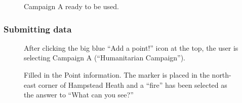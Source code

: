 \documentclass{article}
\begin{document}
		\begin{figure}[H]
			\centering
			\caption{Campaign A ready to be used.}
			\label{fig:eval-ca-4}
		\end{figure}

		\FloatBarrier

		\subsubsection{Submitting data}

		\begin{figure}[H]
			\centering
			\caption{After clicking the big blue ``Add a point!'' icon at the top, the user is selecting Campaign A (``Humanitarian Campaign'').}
			\label{fig:eval-submita-1}
		\end{figure}

		\begin{figure}[H]
			\centering
			\caption{Filled in the Point information. The marker is placed in the north-east corner of Hampstead Heath and a ``fire'' has been selected as the answer to ``What can you see?''}
			\label{fig:eval-submita-2}
		\end{figure}
\end{document}
